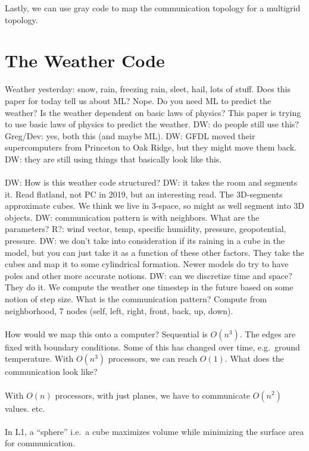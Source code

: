Lastly, we can use gray code to map the communication topology for a multigrid topology.

\section{The Weather Code}
Weather yesterday: snow, rain, freezing rain, sleet, hail, lots of stuff.
Does this paper for today tell us about ML? Nope.
Do you need ML to predict the weather?
Is the weather dependent on basic laws of physics?
This paper is trying to use basic laws of physics to predict the weather.
DW: do people still use this?
Greg/Dev: yes, both this (and maybe ML).
DW: GFDL moved their supercomputers from Princeton to Oak Ridge, but they might move them back.
DW: they are still using things that basically look like this.
\\ \\
DW: How is this weather code structured?
DW: it takes the room and segments it.
Read flatland, not PC in 2019, but an interesting read.
The 3D-segments approximate cubes.
We think we live in 3-space, so might as well segment into 3D objects.
DW: communication pattern is with neighbors.
What are the parameters?
R?: wind vector, temp, specific humidity, pressure, geopotential, pressure.
DW: we don't take into consideration if its raining in a cube in the model, but you can just take it as a function of these other factors.
They take the cubes and map it to some cylindrical formation.
Newer models do try to have poles and other more accurate notions.
DW: can we discretize time and space?
They do it.
We compute the weather one timestep in the future based on some notion of step size.
What is the communication pattern?
Compute from neighborhood, 7 nodes (self, left, right, front, back, up, down).
\\ \\
How would we map this onto a computer?
Sequential is \( O(n^3) \).
The edges are fixed with boundary conditions.
Some of this has changed over time, e.g.\ ground temperature.
With \( O(n^3) \) processors, we can reach \( O(1) \).
What does the communication look like?
\\ \\
With \( O(n) \) processors, with just planes, we have to communicate \( O(n^2) \) values.
etc.
\\ \\
In L1, a ``sphere'' i.e.\ a cube maximizes volume while minimizing the surface area for communication.
\\ \\
